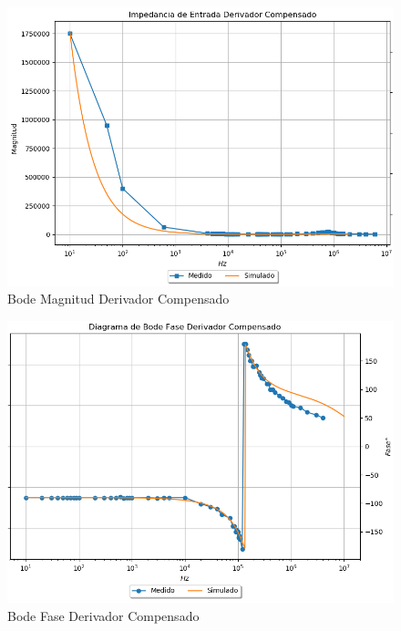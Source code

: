 \begin{figure}[H]
	\centering
	\includegraphics[width=\textwidth]{Ejercicio4/SUPERPOSICION-ZIN-DERIVADOR-COMPENSADO-MAGNITUD} 
	\caption{Bode Magnitud Derivador Compensado}
\end{figure}

\begin{figure}[H]
	\centering
	\includegraphics[width=\textwidth]{Ejercicio4/SUPERPOSICION-FASE-DERIVADOR-COMPENSADO} 
	\caption{Bode Fase Derivador Compensado}
\end{figure}


